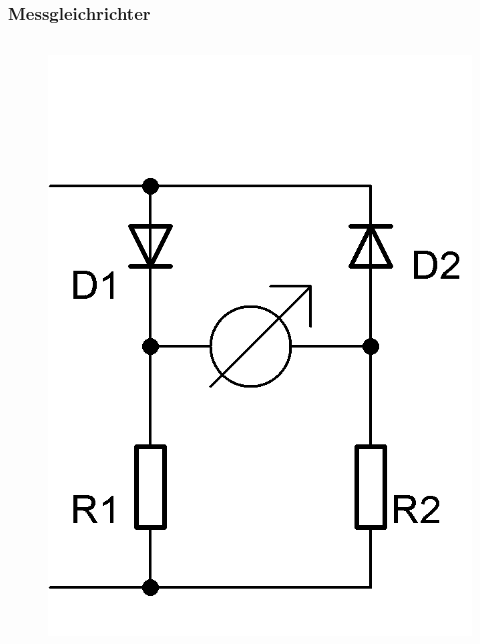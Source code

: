 \begin{frame}
  \frametitle{Messgleichrichter}
  \begin{columns}
    \begin{center}
      \begin{figure}
        \includegraphics[width=\textwidth,height=.4\textheight,keepaspectratio]{a16/Messgleichrichter1.png}

\end{figure}
\end{center}
\end{columns}
\end{frame}
